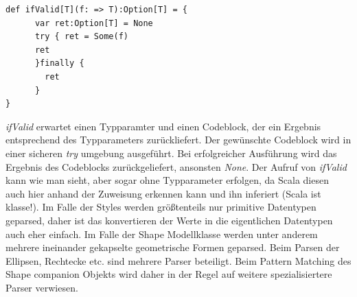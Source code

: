 \begin{lstlisting}[style=scala]
def ifValid[T](f: => T):Option[T] = {
      var ret:Option[T] = None
      try { ret = Some(f)
      ret
      }finally {
        ret
      }
}
\end{lstlisting}\textit{ifValid} erwartet einen Typparamter und einen Codeblock, der ein Ergebnis entsprechend des Typparameters zurückliefert. Der gewünschte Codeblock wird in einer sicheren \textit{try} umgebung ausgeführt. Bei erfolgreicher Ausführung wird das Ergebnis des Codeblocks zurückgeliefert, ansonsten \textit{None}.
Der Aufruf von \textit{ifValid} kann wie man sieht, aber sogar ohne Typparameter erfolgen, da Scala diesen auch hier anhand der Zuweisung erkennen kann und ihn inferiert (Scala ist klasse!).
Im Falle der Styles werden größtenteils nur primitive Datentypen geparsed, daher ist das konvertieren der Werte in die eigentlichen Datentypen auch eher einfach.
Im Falle der Shape Modellklasse werden unter anderem mehrere ineinander gekapselte geometrische Formen geparsed. Beim Parsen der Ellipsen, Rechtecke etc. sind mehrere Parser beteiligt. Beim Pattern Matching des Shape companion Objekts wird daher in der Regel auf weitere spezialisiertere Parser verwiesen.


